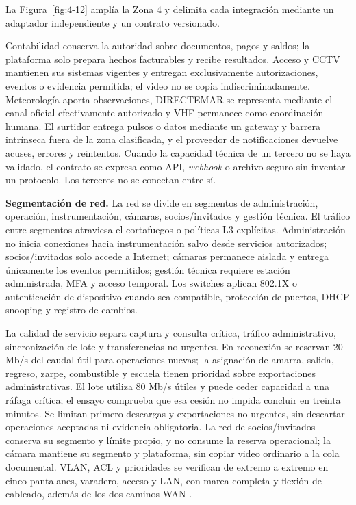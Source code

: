 La Figura~\ref{fig:4-12} amplía la Zona 4 y delimita cada integración mediante un adaptador independiente y un contrato versionado.



Contabilidad conserva la autoridad sobre documentos, pagos y saldos; la plataforma solo prepara hechos facturables y recibe resultados. Acceso y CCTV mantienen sus sistemas vigentes y entregan exclusivamente autorizaciones, eventos o evidencia permitida; el video no se copia indiscriminadamente. Meteorología aporta observaciones, DIRECTEMAR se representa mediante el canal oficial efectivamente autorizado y VHF permanece como coordinación humana. El surtidor entrega pulsos o datos mediante un gateway y barrera intrínseca fuera de la zona clasificada, y el proveedor de notificaciones devuelve acuses, errores y reintentos. Cuando la capacidad técnica de un tercero no se haya validado, el contrato se expresa como API, \emph{webhook} o archivo seguro sin inventar un protocolo. Los terceros no se conectan entre sí.

\textbf{Segmentación de red.} La red se divide en segmentos de administración, operación, instrumentación, cámaras, socios/invitados y gestión técnica. El tráfico entre segmentos atraviesa el cortafuegos o políticas L3 explícitas. Administración no inicia conexiones hacia instrumentación salvo desde servicios autorizados; socios/invitados solo accede a Internet; cámaras permanece aislada y entrega únicamente los eventos permitidos; gestión técnica requiere estación administrada, MFA y acceso temporal. Los switches aplican 802.1X o autenticación de dispositivo cuando sea compatible, protección de puertos, DHCP snooping y registro de cambios.



La calidad de servicio separa captura y consulta crítica, tráfico administrativo, sincronización de lote y transferencias no urgentes. En reconexión se reservan 20 Mb/s del caudal útil para operaciones nuevas; la asignación de amarra, salida, regreso, zarpe, combustible y escuela tienen prioridad sobre exportaciones administrativas. El lote utiliza 80 Mb/s útiles y puede ceder capacidad a una ráfaga crítica; el ensayo comprueba que esa cesión no impida concluir en treinta minutos. Se limitan primero descargas y exportaciones no urgentes, sin descartar operaciones aceptadas ni evidencia obligatoria. La red de socios/invitados conserva su segmento y límite propio, y no consume la reserva operacional; la cámara mantiene su segmento y plataforma, sin copiar video ordinario a la cola documental. VLAN, ACL y prioridades se verifican de extremo a extremo en cinco pantalanes, varadero, acceso y LAN, con marea completa y flexión de cableado, además de los dos caminos WAN \parencites[RT-03.24, p.~10]{pucv-transversal}[cap.~15, RT-03.24]{caso07}.

